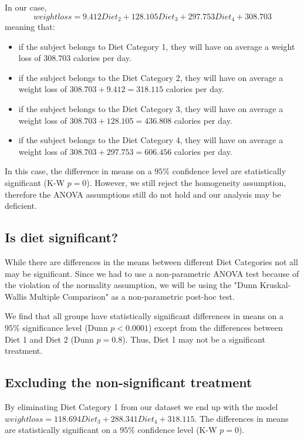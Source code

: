 \documentclass[12pt, a4paper]{article}
\begin{document}
	In our case,
	$$
	weightloss = 9.412 Diet_2 + 128.105 Diet_3 + 297.753 Diet_4 + 308.703
	$$
	meaning that:
	
	\begin{itemize}
		\item if the subject belongs to Diet Category 1, they will have on average a weight loss of $308.703$ calories per day.
		
		\item if the subject belongs to the Diet Category 2, they will have on average a weight loss of $308.703 + 9.412 = 318.115$ calories per day.
		
		\item if the subject belongs to the Diet Category 3, they will have on average a weight loss of $308.703 + 128.105 = 436.808$ calories per day.
		
		\item if the subject belongs to the Diet Category 4, they will have on average a weight loss of $308.703 + 297.753 = 606.456$ calories per day.
	\end{itemize}
	
	In this case, the difference in means on a $95\%$ confidence level are statistically significant (K-W $p=0$). However, we still reject the  homogeneity assumption, therefore the ANOVA assumptions still do not hold and our analysis may be deficient.
	
	
	\subsection{Is diet significant?}
	
	While there are differences in the means between different Diet Categories not all may be significant. Since we had to use a non-parametric ANOVA test because of the violation of the normality assumption, we will be using the "Dunn Kruskal-Wallis Multiple Comparison" as a non-parametric post-hoc test.
	
	We find that all groups have statistically significant differences in means on a $95\%$ significance level (Dunn $p<0.0001$) except from the differences between Diet 1 and Diet 2 (Dunn $p=0.8$). Thus, Diet 1 may not be a significant treatment.
	
	
	\subsection{Excluding the non-significant treatment}
	
	By eliminating Diet Category 1 from our dataset we end up with the model $weightloss = 118.694 Diet_3 + 288.341 Diet_4 + 318.115$. The differences in means are statistically significant on a $95\%$ confidence level (K-W $p=0$). 
	
\end{document}
